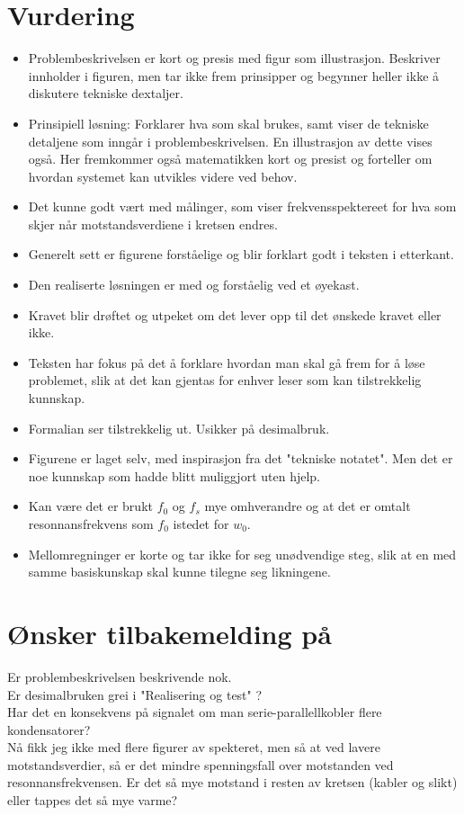 \documentclass[a4paper,11pt,norsk]{article}
\begin{document}
\section{Vurdering}
\begin{itemize}
    \item Problembeskrivelsen er kort og presis med figur som illustrasjon. Beskriver innholder i figuren, men tar ikke frem prinsipper og begynner heller ikke å diskutere tekniske dextaljer.
    \item Prinsipiell løsning: Forklarer hva som skal brukes, samt viser de tekniske detaljene som inngår i problembeskrivelsen. En illustrasjon av dette vises også. Her fremkommer også matematikken kort og presist og forteller om hvordan systemet kan utvikles videre ved behov. 
    \item Det kunne godt vært med målinger, som viser frekvensspektereet for hva som skjer når motstandsverdiene i kretsen endres. 
    \item Generelt sett er figurene forståelige og blir forklart godt i teksten i etterkant.
    \item Den realiserte løsningen er med og forståelig ved et øyekast.
    \item Kravet blir drøftet og utpeket om det lever opp til det ønskede kravet eller ikke.
    \item Teksten har fokus på det å forklare hvordan man skal gå frem for å løse problemet, slik at det kan gjentas for enhver leser som kan tilstrekkelig kunnskap.
    \item Formalian ser tilstrekkelig ut. Usikker på desimalbruk.
    \item Figurene er laget selv, med inspirasjon fra det "tekniske notatet". Men det er noe kunnskap som hadde blitt muliggjort uten hjelp.
    \item Kan være det er brukt $f_0$ og $f_s$ mye omhverandre og at det er omtalt resonnansfrekvens som $f_0$ istedet for $w_0$.
    \item Mellomregninger er korte og tar ikke for seg unødvendige steg, slik at en med samme basiskunskap skal kunne tilegne seg likningene.
\end{itemize}

\section{Ønsker tilbakemelding på}
Er problembeskrivelsen beskrivende nok.\\
Er desimalbruken grei i "Realisering og test" ?\\
Har det en konsekvens på signalet om man serie-parallellkobler flere kondensatorer?\\
Nå fikk jeg ikke med flere figurer av spekteret, men så at ved lavere motstandsverdier, så er det mindre spenningsfall over motstanden ved resonnansfrekvensen. Er det så mye motstand i resten av kretsen (kabler og slikt) eller tappes det så mye varme?


\end{document}
